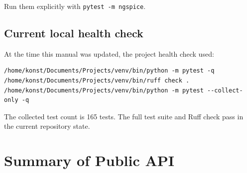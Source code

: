 \documentclass[11pt,a4paper]{article}
\newcommand{\code}[1]{\texttt{#1}}
\begin{document}
Run them explicitly with \code{pytest -m ngspice}.

\subsection{Current local health check}

At the time this manual was updated, the project health check used:

\begin{lstlisting}[style=shell]
/home/konst/Documents/Projects/venv/bin/python -m pytest -q
/home/konst/Documents/Projects/venv/bin/ruff check .
/home/konst/Documents/Projects/venv/bin/python -m pytest --collect-only -q
\end{lstlisting}

The collected test count is 165 tests. The full test suite and Ruff check pass
in the current repository state.

\appendix

\section{Summary of Public API}
\label{app:api-summary}
\end{document}
